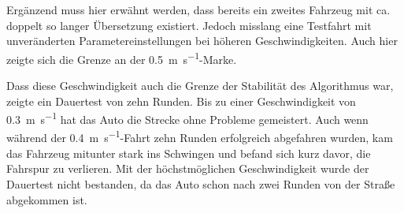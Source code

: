 Ergänzend muss hier erwähnt werden, dass bereits ein zweites Fahrzeug mit ca. doppelt so langer Übersetzung existiert. Jedoch misslang eine Testfahrt mit unveränderten Parametereinstellungen bei höheren Geschwindigkeiten. Auch hier zeigte sich die Grenze an der \SI{0,5}{\metre\per\second}-Marke.

Dass diese Geschwindigkeit auch die Grenze der Stabilität des Algorithmus war, zeigte ein \glqq Dauertest\grqq{} von zehn Runden. Bis zu einer Geschwindigkeit von \SI{0,3}{\metre\per\second} hat das Auto die Strecke ohne Probleme gemeistert. Auch wenn während der \SI{0,4}{\metre\per\second}-Fahrt zehn Runden erfolgreich abgefahren wurden, kam das Fahrzeug mitunter stark ins Schwingen und befand sich kurz davor, die Fahrspur zu verlieren. Mit der höchstmöglichen Geschwindigkeit wurde der Dauertest nicht bestanden, da das Auto schon nach zwei Runden von der Straße abgekommen ist.